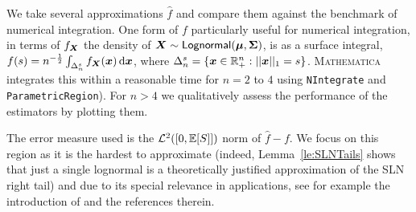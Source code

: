We take several approximations $\widehat{f}$ and compare them against the benchmark of numerical integration.
One form of $f$ particularly useful for numerical integration, in terms of $f_{\bm{X}}$ the density of $\bm{X} \sim \mathsf{Lognormal}(\bm{\mu}, \bm{\Sigma})$, is as a surface integral,
$ f(s) = n^{-\frac12} \int_{\Delta_n^s} f_{\bm{X}}(\bm{x}) \mathop{}\!\mathrm{d} \bm{x} $,
where $\Delta_n^s = \{ \bm{x} \in \mathbb{R}_+^n : ||\bm{x}||_1 = s \}$. \textsc{Mathematica} integrates this within a reasonable time for $n=2$ to $4$ using \texttt{NIntegrate} and \texttt{ParametricRegion}). For $n > 4$ we qualitatively assess the performance of the estimators by plotting them.

The error measure used is the $\mathcal{L}^2([0, \operatorname{{\mathbb E}}[S]])$ norm of $\widehat{f}-f$. We focus on this region as
it is the hardest to approximate (indeed, Lemma~\ref{le:SLNTails} shows that just a single lognormal is a theoretically justified approximation of the SLN right tail) and due to its special relevance in applications, see for example the introduction of \cite {asmussen2015exponential} and the references therein.


